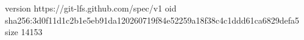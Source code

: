 version https://git-lfs.github.com/spec/v1
oid sha256:3d0f11d1c2b1e5eb91da120260719f84e52259a18f38c4c1ddd61ca6829defa5
size 14153
